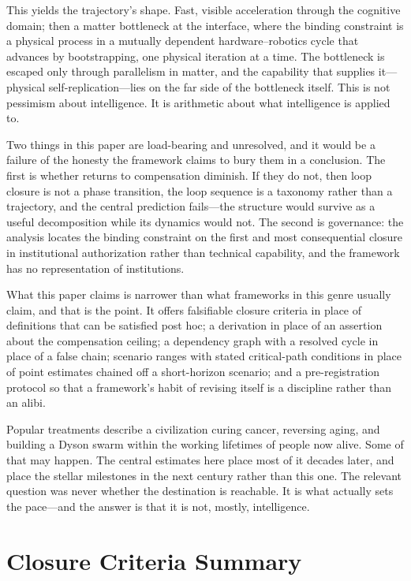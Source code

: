 \documentclass[11pt]{article}
\begin{document}
This yields the trajectory's shape. Fast, visible acceleration through the cognitive domain; then a matter bottleneck at the interface, where the binding constraint is a physical process in a mutually dependent hardware--robotics cycle that advances by bootstrapping, one physical iteration at a time. The bottleneck is escaped only through parallelism in matter, and the capability that supplies it---physical self-replication---lies on the far side of the bottleneck itself. This is not pessimism about intelligence. It is arithmetic about what intelligence is applied to.

Two things in this paper are load-bearing and unresolved, and it would be a failure of the honesty the framework claims to bury them in a conclusion. The first is whether returns to compensation diminish. If they do not, then loop closure is not a phase transition, the loop sequence is a taxonomy rather than a trajectory, and the central prediction fails---the structure would survive as a useful decomposition while its dynamics would not. The second is governance: the analysis locates the binding constraint on the first and most consequential closure in institutional authorization rather than technical capability, and the framework has no representation of institutions.

What this paper claims is narrower than what frameworks in this genre usually claim, and that is the point. It offers falsifiable closure criteria in place of definitions that can be satisfied post hoc; a derivation in place of an assertion about the compensation ceiling; a dependency graph with a resolved cycle in place of a false chain; scenario ranges with stated critical-path conditions in place of point estimates chained off a short-horizon scenario; and a pre-registration protocol so that a framework's habit of revising itself is a discipline rather than an alibi.

Popular treatments describe a civilization curing cancer, reversing aging, and building a Dyson swarm within the working lifetimes of people now alive. Some of that may happen. The central estimates here place most of it decades later, and place the stellar milestones in the next century rather than this one. The relevant question was never whether the destination is reachable. It is what actually sets the pace---and the answer is that it is not, mostly, intelligence.

\appendix

\section{Closure Criteria Summary}
\label{app:criteria}
\end{document}
